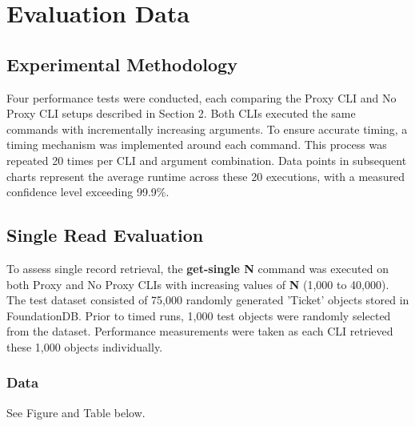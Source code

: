 \documentclass[sigconf]{acmart}
\begin{document}
\section{Evaluation Data}

\subsection{Experimental Methodology}

Four performance tests were conducted, each comparing the Proxy CLI and No Proxy CLI setups described in Section 2. Both CLIs executed the same commands with incrementally increasing arguments. To ensure accurate timing, a timing mechanism was implemented around each command. This process was repeated 20 times per CLI and argument combination. Data points in subsequent charts represent the average runtime across these 20 executions, with a measured confidence level exceeding 99.9\%.

\subsection{Single Read Evaluation}

To assess single record retrieval, the \textbf{get-single N} command was executed on both Proxy and No Proxy CLIs with increasing values of \textbf{N} (1,000 to 40,000). The test dataset consisted of 75,000 randomly generated 'Ticket' objects stored in FoundationDB. Prior to timed runs, 1,000 test objects were randomly selected from the dataset. Performance measurements were taken as each CLI retrieved these 1,000 objects individually.

\subsubsection{Data}

See Figure \label{fig:single_read} and Table \label{tab:single_read} below.
\end{document}
